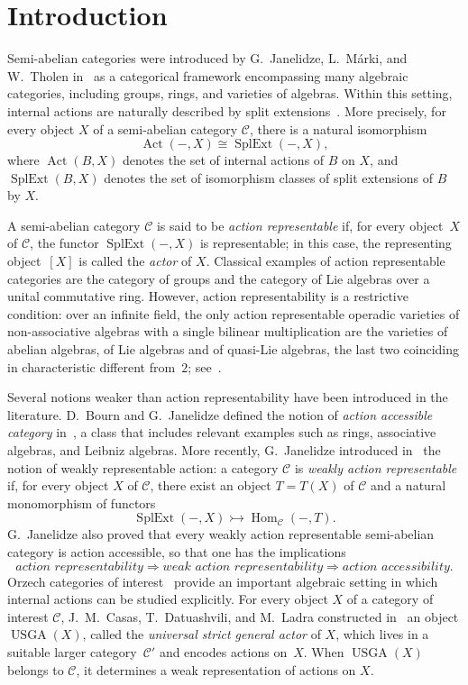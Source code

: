 \documentclass[reqno,a4paper]{amsart}
\theoremstyle{plain}
\theoremstyle{definition}
\theoremstyle{remark}
\numberwithin{equation}{section}
\newcommand{\cC}{\ensuremath{\mathcal{C}}}
\DeclareMathOperator{\Act}{Act}
\DeclareMathOperator{\Hom}{Hom}
\DeclareMathOperator{\SplExt}{SplExt}
\DeclareMathOperator{\USGA}{USGA}
\begin{document}
\maketitle

\section{Introduction}\label{SecIntro}

Semi-abelian categories were introduced by G.~Janelidze, L.~Márki, and W.~Tholen in~\cite{Semi-Ab} as a categorical framework encompassing many algebraic categories, including groups, rings, and varieties of algebras. Within this setting, internal actions are naturally described by split extensions~\cite{BJK}. More precisely, for every object $X$ of a semi-abelian category $\cC$, there is a natural isomorphism
\[
\Act(-,X)\cong\SplExt(-,X),
\]
where $\Act(B,X)$ denotes the set of internal actions of $B$ on $X$, and $\SplExt(B,X)$ denotes the set of isomorphism classes of split extensions of $B$ by $X$.

A semi-abelian category $\cC$ is said to be \emph{action representable} if, for every object~$X$ of $\cC$, the functor $\SplExt(-,X)$ is representable; in this case, the representing object~$[X]$ is called the \emph{actor} of $X$. Classical examples of action representable categories are the category of groups and the category of Lie algebras over a unital commutative ring. However, action representability is a restrictive condition: over an infinite field, the only action representable operadic varieties of non-associative algebras with a single bilinear multiplication are the varieties of abelian algebras, of Lie algebras and of quasi-Lie algebras, the last two coinciding in characteristic different from~$2$; see~\cite[Theorem~6.1]{Tim}.

Several notions weaker than action representability have been introduced in the literature. D.~Bourn and G.~Janelidze defined the notion of \emph{action accessible category} in~\cite{act_accessible}, a class that includes relevant examples such as rings, associative algebras, and Leibniz algebras. More recently, G.~Janelidze introduced in~\cite{WRA} the notion of weakly representable action: a category $\cC$ is \emph{weakly action representable} if, for every object $X$ of $\cC$, there exist an object $T=T(X)$ of $\cC$ and a natural monomorphism of functors
\[
\SplExt(-,X)\rightarrowtail\Hom_{\cC}(-,T).
\]
G.~Janelidze also proved that every weakly action representable semi-abelian category is action accessible, so that one has the implications
\[
\textit{action representability}
\Longrightarrow
\textit{weak action representability}
\Longrightarrow
\textit{action accessibility}.
\]
Orzech categories of interest~\cite{Orzech} provide an important algebraic setting in which internal actions can be studied explicitly. For every object $X$ of a category of interest $\cC$, J.~M.~Casas, T.~Datuashvili, and M.~Ladra constructed in~\cite{Casas} an object $\USGA(X)$, called the \emph{universal strict general actor} of $X$, which lives in a suitable larger category~$\cC'$ and encodes actions on~$X$. When $\USGA(X)$ belongs to $\cC$, it determines a weak representation of actions on $X$.
\end{document}
